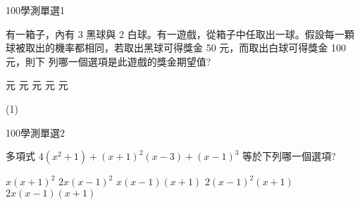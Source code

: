 \begin{QUESTIONS}
    \begin{QUESTION}
        \begin{ExamInfo}{100}{學測}{單選}{1}
        \end{ExamInfo}
        \begin{ExamAnsRateInfo}{85}{99}{98}{58}
        \end{ExamAnsRateInfo}
        \begin{QBODY}
            有一箱子，內有 3 黑球與 2 白球。有一遊戲，從箱子中任取出一球。假設每一顆球被取出的機率都相同，若取出黑球可得獎金 50 元，而取出白球可得獎金 100 元，則下 列哪一個選項是此遊戲的獎金期望值?
			\begin{QOPS} 
				 元
				 元 
				 元 
				 元 
				 元
			\end{QOPS}
        \end{QBODY}
        \begin{QFROMS}
        \end{QFROMS}
        \begin{QTAGS}\end{QTAGS}
        \begin{QANS}
            (1)
        \end{QANS}
        \begin{QSOLLIST}
        \end{QSOLLIST}
        \begin{QEMPTYSPACE}
        \end{QEMPTYSPACE}
    \end{QUESTION}
    \begin{QUESTION}
        \begin{ExamInfo}{100}{學測}{單選}{2}
        \end{ExamInfo}
        \begin{ExamAnsRateInfo}{72}{92}{82}{42}
        \end{ExamAnsRateInfo}
        \begin{QBODY}
            多項式 $4(x^2 +1)+(x+1)^2(x-3)+(x-1)^3$ 等於下列哪一個選項? 
			\begin{QOPS} 
				\QOP $x(x+1)^2$ 
				\QOP $2x(x-1)^2$
				\QOP $x(x-1)(x+1)$    
				\QOP  $2(x-1)^2(x+1)$    
				\QOP $2x(x-1)(x+1)$
			\end{QOPS}
        \end{QBODY}
        \begin{QFROMS}
        \end{QFROMS}

\end{QUESTION}
\end{QUESTIONS}
